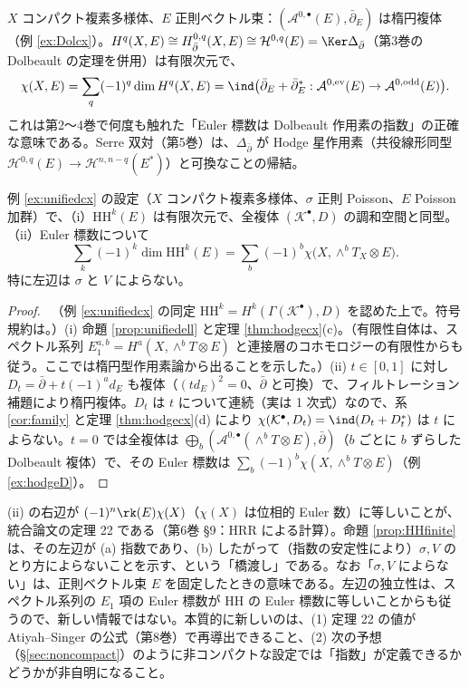 \begin{ex}[Dolbeault の Hodge 定理と $\chi(X,E)=$ 指数]\label{ex:hodgeD}
$X$ コンパクト複素多様体、$E$ 正則ベクトル束：$(\mathcal A^{0,\bullet}(E),\bar\partial_E)$ は楕円複体（例 \ref{ex:Dolcx}）。$H^q(X,E)\cong H^{0,q}_{\bar\partial}(X,E)\cong\mathcal H^{0,q}(E)=\Ker\Delta_{\bar\partial}$（第3巻の Dolbeault の定理を併用）は有限次元で、
\[
\chi(X,E)=\sum_q(-1)^q\dim H^q(X,E)=\ind\bigl(\bar\partial_E+\bar\partial_E^*:\mathcal A^{0,\rm ev}(E)\to\mathcal A^{0,\rm odd}(E)\bigr).
\]
これは第2〜4巻で何度も触れた「Euler 標数は Dolbeault 作用素の指数」の正確な意味である。Serre 双対（第5巻）は、$\Delta_{\bar\partial}$ が Hodge 星作用素（共役線形同型 $\mathcal H^{0,q}(E)\to\mathcal H^{n,n-q}(E^*)$）と可換なことの帰結。
\end{ex}
\begin{prop}\label{prop:HHfinite}
例 \ref{ex:unifiedcx} の設定（$X$ コンパクト複素多様体、$\sigma$ 正則 Poisson、$E$ Poisson 加群）で、（i）$\mathrm{HH}^k(E)$ は有限次元で、全複体 $(\mathcal K^\bullet,D)$ の調和空間と同型。（ii）Euler 標数について
\[
\sum_k(-1)^k\dim\mathrm{HH}^k(E)=\sum_{b}(-1)^b\chi\bigl(X,\wedge^bT_X\otimes E\bigr).
\]
特に左辺は $\sigma$ と $V$ によらない。
\end{prop}
\begin{proof}
\tP\ （例 \ref{ex:unifiedcx} の同定 $\mathrm{HH}^k=H^k(\Gamma(\mathcal K^\bullet),D)$ を認めた上で。符号規約は\tQ。）(i) 命題 \ref{prop:unifiedell} と定理 \ref{thm:hodgecx}(c)。（有限性自体は、スペクトル系列 $E_1^{a,b}=H^a(X,\wedge^bT\otimes E)$ と連接層のコホモロジーの有限性からも従う。ここでは楕円型作用素論から出ることを示した。）(ii) $t\in[0,1]$ に対し $D_t=\bar\partial+t(-1)^ad_E$ も複体（$(td_E)^2=0$、$\bar\partial$ と可換）で、フィルトレーション補題により楕円複体。$D_t$ は $t$ について連続（実は 1 次式）なので、系 \ref{cor:family} と定理 \ref{thm:hodgecx}(d) により $\chi(\mathcal K^\bullet,D_t)=\ind(D_t+D_t^*)$ は $t$ によらない。$t=0$ では全複体は $\bigoplus_b(\mathcal A^{0,\bullet}(\wedge^bT\otimes E),\bar\partial)$（$b$ ごとに $b$ ずらした Dolbeault 複体）で、その Euler 標数は $\sum_b(-1)^b\chi(X,\wedge^bT\otimes E)$（例 \ref{ex:hodgeD}）。
\end{proof}
\begin{rem}[統合論文との関係]
(ii) の右辺が $(-1)^n\rk(E)\chi(X)$（$\chi(X)$ は位相的 Euler 数）に等しいことが、統合論文の定理 22 である（第6巻 \S9：HRR による計算）。命題 \ref{prop:HHfinite} は、その左辺が (a) 指数であり、(b) したがって（指数の安定性により）$\sigma,V$ のとり方によらないことを示す、という「橋渡し」である。なお「$\sigma,V$ によらない」は、正則ベクトル束 $E$ を固定したときの意味である。左辺の独立性は、スペクトル系列の $E_1$ 項の Euler 標数が $\mathrm{HH}$ の Euler 標数に等しいことからも従うので、新しい情報ではない。本質的に新しいのは、(1) 定理 22 の値が Atiyah--Singer の公式（第8巻）で再導出できること、(2) 次の予想（\S\ref{sec:noncompact}）のように非コンパクトな設定では「指数」が定義できるかどうかが非自明になること。
\end{rem}
